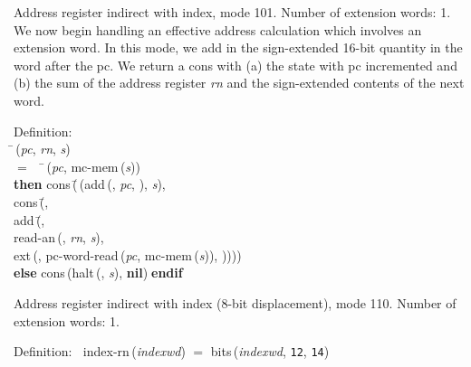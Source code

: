  Address register indirect with index, mode 101.
 Number of extension words: 1.
 We now begin handling an effective address calculation which involves
 an extension word.  In this mode, we add in the sign-extended 16-bit
 quantity in the word after the pc.  We return a cons with (a) the
 state with pc incremented and (b) the sum of the address register {\it{rn\/}}
 and the sign-extended contents of the next word.
\begin{tabbing}{\sc Definition}: \\  
\=\,({\it{pc\/}}, {\it{rn\/}}, {\it{s\/}}) \\ 
$=$$\;\;\;\;$\=\,({\it{pc\/}}, {\rm{mc-mem}}\,({\it{s\/}})) \\ 
{\bf then }{\rm{cons}}\,(\=\,({\rm{add}}\,({}, {\it{pc\/}}, {}), {\it{s\/}}), \\ 
{\rm{cons}}\,(\=, \\ 
{\rm{add}}\,(\=, \\ 
{\rm{read-an}}\,({}, {\it{rn\/}}, {\it{s\/}}), \\ 
{\rm{ext}}\,({}, {\rm{pc-word-read}}\,({\it{pc\/}}, {\rm{mc-mem}}\,({\it{s\/}})), {}))\-)\-)\- \\ 
{\bf else }{\rm{cons}}\,({\rm{halt}}\,({}, {\it{s\/}}), {\bf{nil}})$\;${\bf  endif}\-\-
\end{tabbing}

 Address register indirect with index (8-bit displacement), mode 110.
 Number of extension words: 1.
\begin{tabbing}{\sc Definition}:$\;\;$
{\rm{index-rn}}\,({\it{indexwd\/}}) $=$ {\rm{bits}}\,({\it{indexwd\/}}, {\tt{12}}, {\tt{14}})
\end{tabbing}


